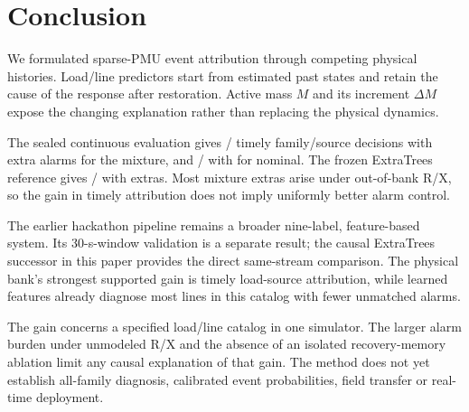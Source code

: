 \section{Conclusion}
\label{sec:conclusion}

We formulated sparse-PMU event attribution through competing physical
histories. Load/line predictors start from estimated past states and retain
the cause of the response after restoration. Active mass $M$ and its
increment $\Delta M$ expose the changing explanation rather than replacing
the physical dynamics.

The sealed continuous
evaluation gives \COneMixTimely{}/\COneMixTotal{} timely family/source
decisions with \COneMixExtras{} extra alarms for the mixture, and
\COneNomTimely{}/\COneNomTotal{} with \COneNomExtras{} for nominal.
The frozen ExtraTrees reference gives \COneETTimely{}/\COneETTotal{}
with \COneETExtras{} extras. Most mixture extras arise under out-of-bank
R/X, so the gain in timely attribution does not imply uniformly better
alarm control.

The earlier hackathon pipeline remains a broader nine-label,
feature-based system. Its 30-s-window validation is a separate result;
the causal ExtraTrees successor in this paper provides the direct
same-stream comparison. The physical bank's strongest supported gain is
timely load-source attribution, while learned features already diagnose
most lines in this catalog with fewer unmatched alarms.

The gain concerns a specified load/line catalog in one simulator. The
larger alarm burden under unmodeled R/X and the absence of an isolated
recovery-memory ablation limit any causal explanation of that gain. The
method does not yet establish all-family diagnosis, calibrated event
probabilities, field transfer or real-time deployment.
